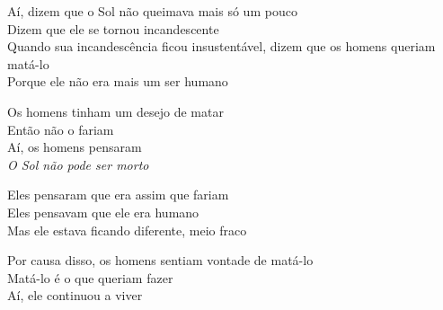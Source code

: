 \bigskip

\begin{linenumbers}\begingroup\raggedright
\noindent Aí, dizem que o Sol não queimava mais só um pouco\\
Dizem que ele se tornou incandescente\\
Quando sua incandescência ficou insustentável, dizem que os homens
queriam matá-lo\\
Porque ele não era mais um ser humano
\end{linenumbers}\endgroup

\bigskip

\begin{linenumbers}\begingroup\raggedright
\noindent Os homens tinham um desejo de matar\\
Então não o fariam\\
Aí, os homens pensaram\\
\emph{O Sol não pode ser morto}
\end{linenumbers}\endgroup

\bigskip

\begin{linenumbers}\begingroup\raggedright
\noindent Eles pensaram que era assim que fariam\\
Eles pensavam que ele era humano\\
Mas ele estava ficando diferente, meio fraco
\end{linenumbers}\endgroup

\bigskip

\begin{linenumbers}\begingroup\raggedright
\noindent Por causa disso, os homens sentiam vontade de matá-lo\\
Matá-lo é o que queriam fazer\\
Aí, ele continuou a viver
\end{linenumbers}\endgroup

